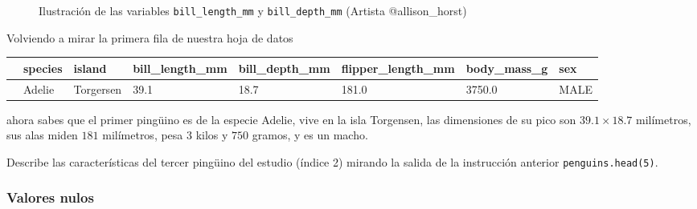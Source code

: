 \documentclass[
  a4paper,
  noprof,
  12pt,
  notoc,
  nosols,
  nobib]{mnye}
\renewenvironment{exercise}[1][]{
            \if\relax\detokenize{#1}\relax
                \ex
            \else
                \ex[note={#1}]
            \fi
        }{\endex}
\theoremstyle{definition}
\newtheorem{exercise}{Ejercicio}[section]
\theoremstyle{remark}
\begin{document}
\begin{figure}[tbph]


\caption{\label{fig-bill}Ilustración de las variables
\texttt{bill\_length\_mm} y \texttt{bill\_depth\_mm} (Artista
@allison\_horst)}

\end{figure}%

Volviendo a mirar la primera fila de nuestra hoja de datos

\begin{longtable}[]{@{}llllllll@{}}
\toprule\noalign{}
& species & island & bill\_length\_mm & bill\_depth\_mm &
flipper\_length\_mm & body\_mass\_g & sex \\
\midrule\noalign{}
\endhead
\bottomrule\noalign{}
\endlastfoot
0 & Adelie & Torgersen & 39.1 & 18.7 & 181.0 & 3750.0 & MALE \\
\end{longtable}

ahora sabes que el primer pingüino es de la especie Adelie, vive en la
isla Torgensen, las dimensiones de su pico son \(39.1 \times 18.7\)
milímetros, sus alas miden \(181\) milímetros, pesa \(3\) kilos y
\(750\) gramos, y es un macho.

\begin{exercise}[]%
\protect\hypertarget{exr-data}{}\label{exr-data}%
Describe las características del tercer pingüino del estudio (índice 2)
mirando la salida de la instrucción anterior \texttt{penguins.head(5)}.

\end{exercise}

\subsubsection{Valores nulos}\label{valores-nulos}
\end{document}
